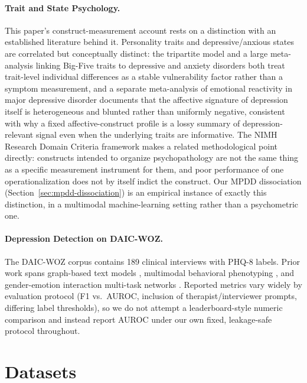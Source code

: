 \documentclass[twocolumn]{article}
\begin{document}
\paragraph{Trait and State Psychology.} This paper's construct-measurement account rests on a distinction with an established literature behind it. Personality traits and depressive/anxious states are correlated but conceptually distinct: the tripartite model \citep{clark1991tripartite} and a large meta-analysis linking Big-Five traits to depressive and anxiety disorders \citep{kotov2010linking} both treat trait-level individual differences as a stable vulnerability factor rather than a symptom measurement, and a separate meta-analysis of emotional reactivity in major depressive disorder \citep{bylsma2008differential} documents that the affective signature of depression itself is heterogeneous and blunted rather than uniformly negative, consistent with why a fixed affective-construct profile is a lossy summary of depression-relevant signal even when the underlying traits are informative. The NIMH Research Domain Criteria framework \citep{insel2010rdoc} makes a related methodological point directly: constructs intended to organize psychopathology are not the same thing as a specific measurement instrument for them, and poor performance of one operationalization does not by itself indict the construct. Our MPDD dissociation (Section~\ref{sec:mpdd-dissociation}) is an empirical instance of exactly this distinction, in a multimodal machine-learning setting rather than a psychometric one.

\paragraph{Depression Detection on DAIC-WOZ.} The DAIC-WOZ corpus \citep{gratch2014distress} contains 189 clinical interviews with PHQ-8 labels. Prior work spans graph-based text models \citep{burdisso2024gcndp}, multimodal behavioral phenotyping \citep{chen2026multimodal}, and gender-emotion interaction multi-task networks \citep{xing2026gender}. Reported metrics vary widely by evaluation protocol (F1 vs.\ AUROC, inclusion of therapist/interviewer prompts, differing label thresholds), so we do not attempt a leaderboard-style numeric comparison and instead report AUROC under our own fixed, leakage-safe protocol throughout.

\section{Datasets}
\label{sec:datasets}
\end{document}
